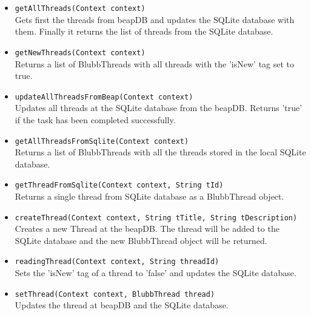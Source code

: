 \documentclass[12pt,a4paper,oneside]{report}
\newcommand{\beapDB}{beapDB}
\newcommand{\code}[1]{\lstinline{#1}}
\begin{document}
\begin{itemize}
\item{\code{getAllThreads(Context context)}}\\
Gets first the threads from \beapDB{} and updates the SQLite database with them. Finally it returns the list of threads from the SQLite database.

\item{\code{getNewThreads(Context context)}}\\
Returns a list of BlubbThreads with all threads with the 'isNew' tag set to true.
 
\item{\code{updateAllThreadsFromBeap(Context context)}}\\
Updates all threads at the SQLite database from the \beapDB{}. Returns 'true' if the task has been completed successfully.

\item{\code{getAllThreadsFromSqlite(Context context)}}\\
Returns a list of BlubbThreads with all the threads stored in the local SQLite database.

\item{\code{getThreadFromSqlite(Context context, String tId)}}\\
Returns a single thread from SQLite database as a BlubbThread object.

\item{\code{createThread(Context context, String tTitle, String tDescription)}}\\
Creates a new Thread at the \beapDB{}. The thread will be added to the SQLite database and the new BlubbThread object will be returned.

\item{\code{readingThread(Context context, String threadId)}}\\
Sets the 'isNew' tag of a thread to 'false' and updates the SQLite database.

\item{\code{setThread(Context context, BlubbThread thread)}}\\
Updates the thread at \beapDB{} and the SQLite database.

\end{itemize}
\end{document}

